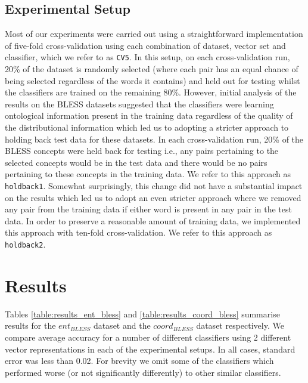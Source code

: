 \documentclass[11pt]{article}
\begin{document}
\subsection{Experimental Setup}

Most of our experiments were carried out using a straightforward implementation of five-fold cross-validation using each combination of dataset, vector set and classifier, which we refer to as \texttt{CV5}.  In this setup, on each cross-validation run, 20\% of the dataset is randomly selected (where each pair has an equal chance of being selected regardless of the words it contains) and held out for testing whilst the classifiers are trained on the remaining 80\%.  However, initial analysis of the results on the BLESS datasets suggested that the classifiers were learning ontological information present in the training data regardless of the quality of the distributional information which led us to adopting a stricter approach to holding back test data for these datasets.  In each cross-validation run, 20\% of the BLESS concepts were held back for testing i.e., any pairs pertaining to the selected concepts would be in the test data and there would be no pairs pertaining to these concepts in the training data.  We refer to this approach as \texttt{holdback1}.  Somewhat surprisingly, this change did not have a substantial impact on the results which led us to adopt an even stricter approach where we removed any pair from the training data if either word is present in any pair in the test data.  In order to preserve a reasonable amount of training data, we implemented this approach with ten-fold cross-validation.  We refer to this approach as \texttt{holdback2}.

\section{Results}
\label{sect:results}

Tables \ref{table:results_ent_bless} and \ref{table:results_coord_bless} summarise results for the $ent_{BLESS}$ dataset and the $coord_{BLESS}$ dataset respectively.  We compare average accuracy for a number of different classifiers using 2 different vector representations in each of the experimental setups.  In all cases, standard error was less than 0.02.  For brevity we omit some of the classifiers which performed worse (or not significantly differently) to other similar classifiers.
\end{document}
